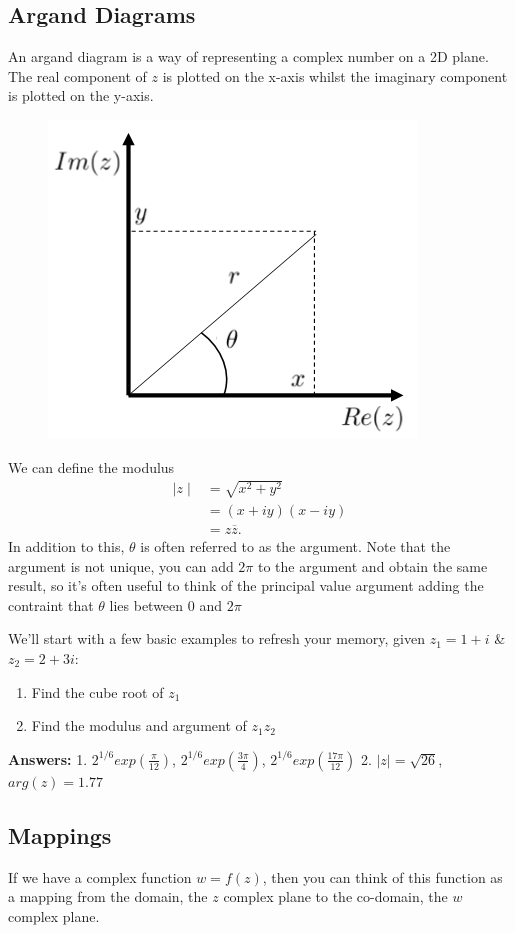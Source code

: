 \subsection{Argand Diagrams}
An argand diagram is a way of representing a complex number on a 2D plane.
 The real component of $z$ is plotted on the x-axis whilst the imaginary component is plotted on the y-axis.
 \begin{minipage}[t]{0.47\linewidth}
 	\begin{figure}[H]
 		\centering
 		\includegraphics[width=\linewidth]{complex/argand}
 		\captionsetup{font=small} 	
 	\end{figure} 
 \end{minipage}
 \hspace{0.6cm}
%
\begin{minipage}[t]{0.47\linewidth}
	\vspace{1cm}
	We can define the modulus 
	\begin{align*}
	\mid z \mid &= \sqrt{x^2+y^2} \\
	&= (x+iy)(x-iy) \\
	&= z\overline{z}.
	\end{align*}
	In addition to this, $\theta$ is often referred to as the argument.
	 Note that the argument is not unique, you can add $2\pi$ to the argument and obtain the same result, so it's often useful to think of the principal value argument adding the contraint that $\theta$ lies between $0$ and $2\pi$
\end{minipage}
\begin{examples}
	We'll start with a few basic examples to refresh your memory, given $z_1=1+i$ \& $z_2=2+3i$:
	\begin{enumerate}
		\item Find the cube root of $z_1$
		\item Find the modulus and argument of $z_1z_2$
	\end{enumerate}
\textbf{Answers:} 1. $2^{1/6}exp(\frac{\pi}{12})$, $2^{1/6}exp(\frac{3\pi}{4})$, $2^{1/6}exp(\frac{17\pi}{12})$ \hspace{0.5cm}
2. $\mid z\mid = \sqrt{26}$, $arg(z)=1.77$
\end{examples}
\subsection{Mappings}
If we have a complex function $w=f(z)$, then you can think of this function as a mapping from the domain, the $z$ complex plane to the co-domain, the $w$ complex plane.